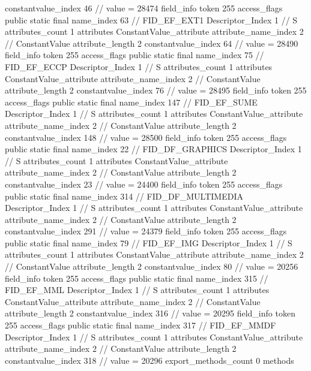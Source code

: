 {{{{{{{					constantvalue_index	46		// value = 28474
				}
				}
			}
			field_info {
				token	255
				access_flags	public static final
				name_index	63		// FID_EF_EXT1
				Descriptor_Index	1		// S
				attributes_count	1
				attributes {
				ConstantValue_attribute {
					attribute_name_index	2		// ConstantValue
					attribute_length	2
					constantvalue_index	64		// value = 28490
				}
				}
			}
			field_info {
				token	255
				access_flags	public static final
				name_index	75		// FID_EF_ECCP
				Descriptor_Index	1		// S
				attributes_count	1
				attributes {
				ConstantValue_attribute {
					attribute_name_index	2		// ConstantValue
					attribute_length	2
					constantvalue_index	76		// value = 28495
				}
				}
			}
			field_info {
				token	255
				access_flags	public static final
				name_index	147		// FID_EF_SUME
				Descriptor_Index	1		// S
				attributes_count	1
				attributes {
				ConstantValue_attribute {
					attribute_name_index	2		// ConstantValue
					attribute_length	2
					constantvalue_index	148		// value = 28500
				}
				}
			}
			field_info {
				token	255
				access_flags	public static final
				name_index	22		// FID_DF_GRAPHICS
				Descriptor_Index	1		// S
				attributes_count	1
				attributes {
				ConstantValue_attribute {
					attribute_name_index	2		// ConstantValue
					attribute_length	2
					constantvalue_index	23		// value = 24400
				}
				}
			}
			field_info {
				token	255
				access_flags	public static final
				name_index	314		// FID_DF_MULTIMEDIA
				Descriptor_Index	1		// S
				attributes_count	1
				attributes {
				ConstantValue_attribute {
					attribute_name_index	2		// ConstantValue
					attribute_length	2
					constantvalue_index	291		// value = 24379
				}
				}
			}
			field_info {
				token	255
				access_flags	public static final
				name_index	79		// FID_EF_IMG
				Descriptor_Index	1		// S
				attributes_count	1
				attributes {
				ConstantValue_attribute {
					attribute_name_index	2		// ConstantValue
					attribute_length	2
					constantvalue_index	80		// value = 20256
				}
				}
			}
			field_info {
				token	255
				access_flags	public static final
				name_index	315		// FID_EF_MML
				Descriptor_Index	1		// S
				attributes_count	1
				attributes {
				ConstantValue_attribute {
					attribute_name_index	2		// ConstantValue
					attribute_length	2
					constantvalue_index	316		// value = 20295
				}
				}
			}
			field_info {
				token	255
				access_flags	public static final
				name_index	317		// FID_EF_MMDF
				Descriptor_Index	1		// S
				attributes_count	1
				attributes {
				ConstantValue_attribute {
					attribute_name_index	2		// ConstantValue
					attribute_length	2
					constantvalue_index	318		// value = 20296
				}
				}
			}
			}
			export_methods_count	0
			methods {
			}
		}
	}
}

